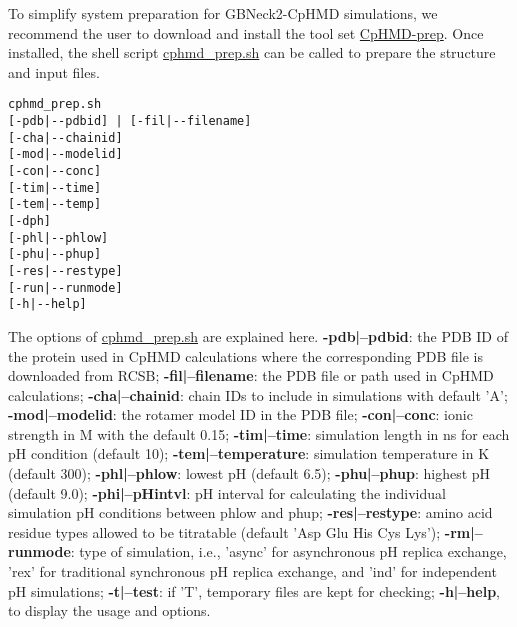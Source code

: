 To simplify system preparation for GBNeck2-CpHMD simulations,
we recommend the user to download and install the tool set \href{https://gitlab.com/shenlab-amber-cphmd/cphmd-prep/}{CpHMD-prep}.
Once installed, the shell script \href{https://gitlab.com/shenlab-amber-cphmd/cphmd-prep/-/tree/master/cphmd_tools/cphmd_prep.sh}{cphmd\_prep.sh} can be called to prepare the structure and input files.
\begin{lstlisting}
cphmd_prep.sh 
[-pdb|--pdbid] | [-fil|--filename]
[-cha|--chainid] 
[-mod|--modelid] 
[-con|--conc] 
[-tim|--time] 
[-tem|--temp]
[-dph] 
[-phl|--phlow]
[-phu|--phup] 
[-res|--restype]
[-run|--runmode] 
[-h|--help]
\end{lstlisting}
The options of 
\href{https://gitlab.com/shenlab-amber-cphmd/cphmd-prep/-/tree/master/cphmd_tools/cphmd_prep.sh}{cphmd\_prep.sh}
are explained here.
 \textbf{-pdb|--pdbid}: the PDB ID of the protein used in CpHMD calculations where the corresponding PDB file is downloaded from RCSB; 
\textbf{-fil|--filename}: the PDB file or path used in CpHMD calculations; 
\textbf{-cha|--chainid}: chain IDs to include in simulations with default 'A'; 
\textbf{-mod|--modelid}: the rotamer model ID in the PDB file;
\textbf{-con|--conc}: ionic strength in M with the default 0.15; 
\textbf{-tim|--time}: simulation length in ns for each pH condition (default 10); 
\textbf{-tem|--temperature}: simulation temperature in K (default 300); 
\textbf{-phl|--phlow}: lowest pH (default 6.5);
\textbf{-phu|--phup}: highest pH (default 9.0);
\textbf{-phi|--pHintvl}: pH interval for calculating the individual
simulation pH conditions between phlow and phup; 
\textbf{-res|--restype}: amino acid residue types allowed to be titratable (default 'Asp Glu His Cys Lys'); 
\textbf{-rm|--runmode}: type of simulation, i.e., 'async' for asynchronous pH replica exchange, 
'rex' for traditional synchronous pH replica exchange,
and 'ind' for independent pH simulations; 
\textbf{-t|--test}: if 'T', temporary files are kept for checking;
\textbf{-h|--help}, to display the usage and options.

